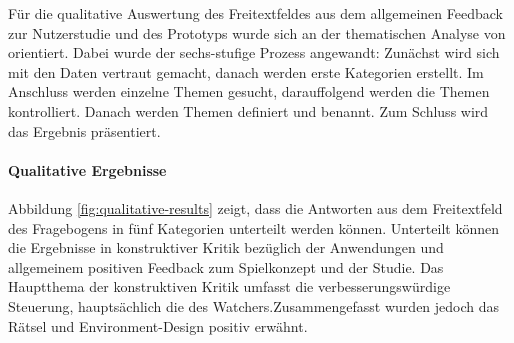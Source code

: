 Für die qualitative Auswertung des Freitextfeldes  aus dem allgemeinen Feedback zur Nutzerstudie und des Prototyps wurde sich an der thematischen Analyse von \cite{braun_using_2006} orientiert. Dabei wurde der sechs-stufige Prozess angewandt: Zunächst wird sich mit den Daten vertraut gemacht, danach werden erste Kategorien erstellt. Im Anschluss werden einzelne Themen gesucht, darauffolgend werden die Themen kontrolliert. Danach werden Themen definiert und benannt. Zum Schluss wird das Ergebnis präsentiert.

\paragraph{Qualitative Ergebnisse}
Abbildung \ref{fig:qualitative-results} zeigt, dass die Antworten aus dem Freitextfeld des Fragebogens in fünf Kategorien unterteilt werden können.
Unterteilt können die Ergebnisse in konstruktiver Kritik bezüglich der Anwendungen und allgemeinem positiven Feedback zum Spielkonzept und der Studie.
Das Hauptthema der konstruktiven Kritik umfasst die verbesserungswürdige Steuerung, hauptsächlich die des Watchers.Zusammengefasst wurden jedoch das Rätsel und Environment-Design positiv erwähnt.


